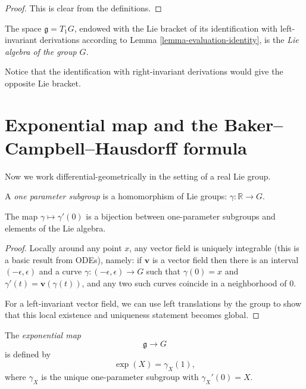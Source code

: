 \begin{proof}
 This is clear from the definitions.
\end{proof}

\begin{definition}
\label{definition-Liealgebra-ofgroup}
 The space $\mathfrak g= T_1 G$, endowed with the Lie bracket of its identification with left- invariant derivations according to Lemma \ref{lemma-evaluation-identity}, is the {\it Lie algebra of the group $G$}.
\end{definition}

Notice that the identification with right-invariant derivations would give the opposite Lie bracket. 

\section{Exponential map and the Baker--Campbell--Hausdorff formula}
\label{section-exponentialmap}

Now we work differential-geometrically in the setting of a real Lie group. 

\begin{definition}
\label{definition-oneparameter-subgroup}
 A {\it one parameter subgroup} is a homomorphism of Lie groups: $\gamma:\mathbb R\to G$. 
\end{definition}


\begin{lemma}
\label{lemma-oneparameter}
 The map $\gamma\mapsto \gamma'(0)$ is a bijection between one-parameter subgroups and elements of the Lie algebra.
\end{lemma}

\begin{proof}
 Locally around any point $x$, any vector field is uniquely integrable (this is a basic result from ODEs), namely: if $\mathbf v$ is a vector field then there is an interval $(-\epsilon,\epsilon)$ and a curve $\gamma:(-\epsilon,\epsilon)\to G$ such that $\gamma(0)=x$ and $\gamma'(t)=\mathbf v(\gamma(t))$, and any two such curves coincide in a neighborhood of $0$. 

 For a left-invariant vector field, we can use left translations by the group to show that this local existence and uniqueness statement becomes global.
\end{proof}

\begin{definition}
\label{definition-exponential-map}
The {\it exponential map}
$$\mathfrak g\to G$$
is defined by
$$\exp(X) = \gamma_X(1),$$
where $\gamma_X$ is the unique one-parameter subgroup with $\gamma_X'(0)=X$.
\end{definition}


